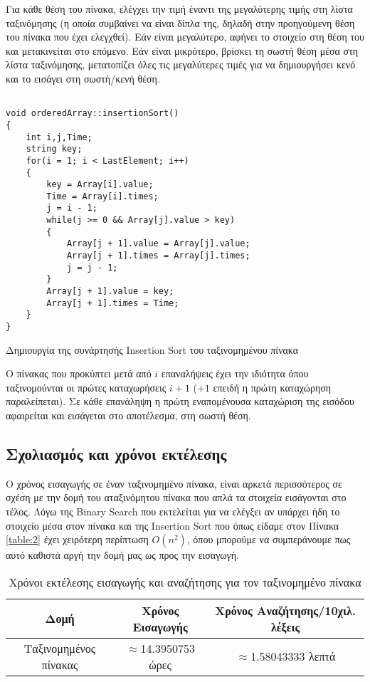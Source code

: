 Για κάθε θέση του πίνακα, ελέγχει την τιμή έναντι της μεγαλύτερης τιμής στη λίστα ταξινόμησης (η οποία συμβαίνει να είναι δίπλα της, δηλαδή στην προηγούμενη θέση του πίνακα που έχει ελεγχθεί). Εάν είναι μεγαλύτερο, αφήνει το στοιχείο στη θέση του και μετακινείται στο επόμενο. Εάν είναι μικρότερο, βρίσκει τη σωστή θέση μέσα στη λίστα ταξινόμησης, μετατοπίζει όλες τις μεγαλύτερες τιμές για να δημιουργήσει κενό και το εισάγει στη σωστή/κενή θέση.

\en
\begin{listing}[ht]
\begin{verbatim}

void orderedArray::insertionSort()
{
    int i,j,Time;
    string key;
    for(i = 1; i < LastElement; i++)
    {
        key = Array[i].value;
        Time = Array[i].times;
        j = i - 1;
        while(j >= 0 && Array[j].value > key)
        {
            Array[j + 1].value = Array[j].value;
            Array[j + 1].times = Array[j].times;
            j = j - 1;
        }
        Array[j + 1].value = key;
        Array[j + 1].times = Time;
    }
}

\end{verbatim}
\caption{Δημιουργία της συνάρτησής Insertion Sort του ταξινομημένου πίνακα}
\label{listing:8}
\end{listing}
\gr

Ο πίνακας που προκύπτει μετά από $i$ επαναλήψεις έχει την ιδιότητα όπου ταξινομούνται οι πρώτες καταχωρήσεις $i+1$ ($+1$ επειδή η πρώτη καταχώρηση παραλείπεται). Σε κάθε επανάληψη η πρώτη εναπομένουσα καταχώριση της εισόδου αφαιρείται και εισάγεται στο αποτέλεσμα, στη σωστή θέση.


\subsection{Σχολιασμός και χρόνοι εκτέλεσης}

Ο χρόνος εισαγωγής σε έναν ταξινομημένο πίνακα, είναι αρκετά περισσότερος σε σχέση με την δομή του αταξινόμητου πίνακα που απλά τα στοιχεία εισάγονται στο τέλος. Λόγω της \en Binary Search \gr που εκτελείται για να ελέγξει αν υπάρχει ήδη το στοιχείο μέσα στον πίνακα και της \en Insertion Sort \gr που όπως είδαμε στον Πίνακα \ref{table:2} έχει χειρότερη περίπτωση $O(n^2)$, όπου μπορούμε να συμπεράνουμε πως αυτό καθιστά αργή την δομή μας ως προς την εισαγωγή.

\gr
\begin{table}[!h]
\centering
\begin{tabular}{||c c c||} 
 \hline
 Δομή & Χρόνος Εισαγωγής & Χρόνος Αναζήτησης/10χιλ. λέξεις \\
 \hline\hline
 Ταξινομημένος πίνακας & $\approx$14.3950753 ώρες & $\approx$1.58043333 λεπτά \\
 \hline
\end{tabular}
\caption{Χρόνοι εκτέλεσης εισαγωγής και αναζήτησης για τον ταξινομημένο πίνακα}
\label{table:4}
\end{table}

